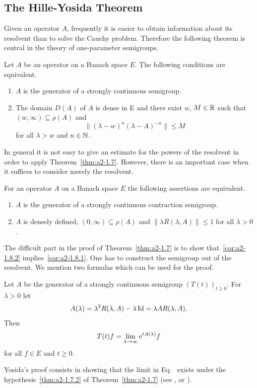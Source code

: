\subsection{The Hille-Yosida Theorem} \label{subsec:a2-1.se3}%
Given an operator $A$, frequently it is easier to obtain information about its resolvent than to solve the Cauchy problem.
Therefore the following theorem is central in the theory of one-parameter semigroups.
\begin{theorem}\label{thm:a2-1.7}
Let $A$ be an operator on a Banach space $E$.
The following conditions are equivalent.
\begin{enumerate}[\upshape (a)]
\item \label{thm:a2-1.7.1}
$A$ is the generator of a strongly continuous semigroup.
\item \label{thm:a2-1.7.2}
The domain  $D(A)$ of\/ $A$ is dense in E and there exist $w$, $M \in \mathbb{R}$ such that $(w,\infty) \subseteq \rho(A)$ and
\[
    \| {(\lambda - w)^{n}} (\lambda-A)^{-n}\| \leq M 
\]
for all $\lambda > w$ and $n \in \mathbb{N}$.
\end{enumerate}
\end{theorem}
In general it is not easy to give an estimate for the powers of the resolvent in order to apply Theorem~\ref{thm:a2-1.7}. 
However, there is an important case when it suffices to consider merely the resolvent.
\begin{corollary}\label{cor:a2-1.8}
For an operator $A$ on a Banach space $E$ the following assertions are equivalent.
\begin{enumerate}[\upshape (a)]
\item \label{cor:a2-1.8.1}
$A$ is the generator of a strongly continuous contraction semigroup.
\item \label{cor:a2-1.8.2}
$A$ is densely defined, $(0,\infty) \subseteq \rho(A)$ and $\|\lambda R(\lambda,A)\| \leq 1$ for all $\lambda > 0$.
\end{enumerate}
\end{corollary}
The difficult part in the proof of Theorem~\ref{thm:a2-1.7}   is to show that~\ref{cor:a2-1.8.2}   implies~\ref{cor:a2-1.8.1}. 
One has to construct the semigroup out of the resolvent.
We mention two formulas which can be used for the proof.
\begin{proposition}\label{prop:a2-1.9}
Let $A$ be the generator of a strongly continuous semigroup
$(T(t))_{t \geq 0}$.
For $\lambda > 0$ let 
\[
A(\lambda) = \lambda^{2} R(\lambda,A)-\lambda \operatorname{Id}  =\lambda A R(\lambda,A).
\]
Then
\begin{equation}\label{eq:a2-1.2}
    T(t)f = \lim_{\lambda \to \infty} \mathrm{e}^{tA(\lambda)}f
\end{equation}
for all $f \in E$ and $t \geq 0$.
\end{proposition}
Yosida's proof consists in showing that the limit in Eq.~ exists under the hypothesis~\ref{thm:a2-1.7.2} of Theorem~\ref{thm:a2-1.7}  
(see \textcite{davies:1980}, \textcite{goldstein:1985b} or \textcite{pazy:1983}).

